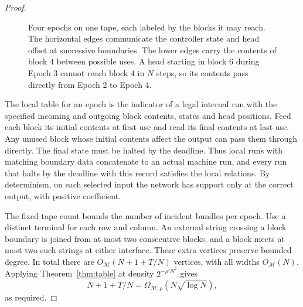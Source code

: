 \begin{proof}
\begin{figure}[!htb]
\centering
{}
\caption{Four epochs on one tape, each labeled by the blocks it may reach.
The horizontal edges communicate the
controller state and head offset at successive boundaries. The lower
edges carry the contents of block $4$ between possible uses. A head
starting in block $6$ during Epoch 3 cannot reach block $4$ in $N$ steps,
so its contents pass directly from Epoch 2 to Epoch 4.}
\label{fig:epoch-block}
\end{figure}

The local table for an epoch is the indicator of a legal internal
run with the specified incoming and outgoing block contents, states
and head positions. Feed each block its initial contents at first use
and read its final contents at last use. Any unused block whose
initial contents affect the output can pass them through directly.
The final state must be halted by the deadline. Thus local runs
with matching boundary data concatenate to an actual machine run,
and every run that halts by the deadline with this record satisfies the
local relations. By
determinism, on each selected input the network has support only at
the correct output, with positive coefficient.

The fixed tape count bounds the number of incident bundles per epoch.
Use a distinct terminal for each row and column. An external string
crossing a block boundary is joined from at most two consecutive
blocks, and a block meets at most two such strings at either interface.
These extra vertices preserve bounded degree. In total there are
$O_{\mathcal M}(N+1+T/N)$ vertices, with all widths
$O_{\mathcal M}(N)$. Applying Theorem~\ref{thm:table} at density
$2^{-\rho'N^2}$ gives
\[
             N+1+T/N=\Omega_{\mathcal M,\rho}(N\sqrt{\log N}),
\]
as required.
\end{proof}

